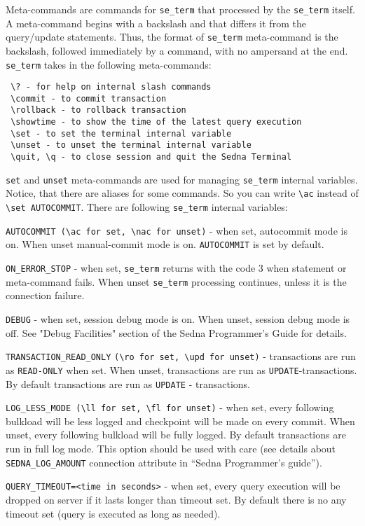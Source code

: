 \documentclass[a4paper,12pt]{article}
\begin{document}
Meta-commands are commands for \verb!se_term! that processed by the
\verb!se_term! itself. A meta-command begins with a backslash and that differs
it from the query/update statements. Thus, the format of \verb!se_term!
meta-command is the backslash, followed immediately by a command, with no
ampersand at the end. \verb!se_term! takes in the following meta-commands:

\small{
\begin{verbatim}
 \? - for help on internal slash commands
 \commit - to commit transaction
 \rollback - to rollback transaction
 \showtime - to show the time of the latest query execution
 \set - to set the terminal internal variable
 \unset - to unset the terminal internal variable
 \quit, \q - to close session and quit the Sedna Terminal
\end{verbatim}}

\verb!set! and \verb!unset! meta-commands are used for managing \verb!se_term!
internal variables. Notice, that there are aliases for some commands. So you can
write \verb!\ac! instead of \verb!\set AUTOCOMMIT!. There are following
\verb!se_term! internal variables:

\verb!AUTOCOMMIT (\ac for set, \nac for unset)! - when set, autocommit mode is
on. When unset manual-commit mode is on. \verb!AUTOCOMMIT! is set by default.

\verb!ON_ERROR_STOP! - when set, \verb!se_term! returns with the code 3 when
statement or meta-command fails. When unset \verb!se_term! processing continues,
unless it is the connection failure.

\verb!DEBUG! - when set, session debug mode is on. When unset, session debug
mode is off. See "Debug Facilities" section of the Sedna Programmer's Guide for
details.

\verb!TRANSACTION_READ_ONLY! \verb!(\ro for set, \upd for unset)! - transactions
are run as \verb!READ-ONLY! when set. When unset, transactions are run as
\verb!UPDATE!-transactions. By default transactions are run as \verb!UPDATE! -
transactions.

\verb!LOG_LESS_MODE (\ll for set, \fl for unset)! - when set, every following
bulkload will be less logged and checkpoint will be made on every commit. When
unset, every following bulkload will be fully logged. By default transactions
are run in full log mode. This option should be used with care (see details
about \verb!SEDNA_LOG_AMOUNT! connection attribute in ``Sedna Programmer's
guide'').

\verb!QUERY_TIMEOUT=<time in seconds>! - when set, every query execution will be
dropped on server if it lasts longer than timeout set. By default there is no
any timeout set (query is executed as long as needed).
\end{document}
